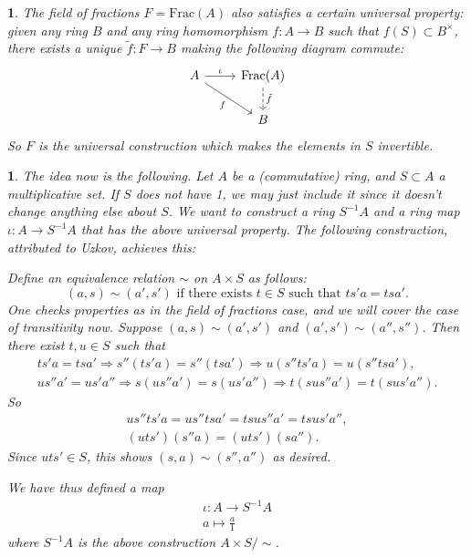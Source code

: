 \documentclass[12pt]{article}
\newtheorem{para}[theorem]{}
\begin{document}
\begin{para}
\label{para_ump_localization}
	The field of fractions $F=\text{Frac}(A)$ also satisfies a certain universal property: given any ring $B$ and any ring homomorphism $f:A\to B$ such that $f(S)\subset B^\times$, there exists a unique $\tilde{f}:F\to B$ making the following diagram commute:
	\begin{equation*}
\begin{tikzcd}
A \arrow[r, "\iota"] \arrow[rd, "f"'] & \text{Frac}(A) \arrow[d, "\tilde{f}", dashed] \\
                                      & B                                            
\end{tikzcd}
	\end{equation*}
	So $F$ is the universal construction which makes the elements in $S$ invertible.
\end{para}

\begin{para}
	The idea now is the following. Let $A$ be a (commutative) ring, and $S\subset A$ a multiplicative set. If $S$ does not have 1, we may just include it since it doesn't change anything else about $S$. We want to construct a ring $S^{-1}A$ and a ring map $\iota: A\to S^{-1}A$ that has the above universal property. The following construction, attributed to Uzkov, achieves this:

	Define an equivalence relation $\sim$ on $A\times S$ as follows: 
	\begin{equation*}
		(a,s)\sim (a',s') \text{ if there exists } t\in S \text{ such that } ts'a = tsa'.
	\end{equation*}
	One checks properties as in the field of fractions case, and we will cover the case of transitivity now. Suppose $(a,s)\sim (a',s')$ and $(a',s')\sim(a'',s'')$. Then there exist $t,u\in S$ such that 
	\begin{gather*}
		ts'a = tsa' \Rightarrow s''(ts'a)=s''(tsa') \Rightarrow u(s''ts'a)=u(s''tsa'), \\
		us''a'=us'a'' \Rightarrow s(us''a')=s(us'a'') \Rightarrow t(sus''a')=t(sus'a'').
	\end{gather*}
	So 
	\begin{gather*}
		us''ts'a = us''tsa' = tsus''a' = tsus'a'', \\
		(uts')(s''a) = (uts')(sa'').
	\end{gather*}
	Since $uts'\in S$, this shows $(s,a)\sim (s'',a'')$ as desired.

	We have thus defined a map 
	\begin{gather*}
		\iota: A \to S^{-1}A \\
		a \mapsto \frac{a}{1}
	\end{gather*}
	where $S^{-1}A$ is the above construction $A\times S/\sim$. 
\end{para}
\end{document}
